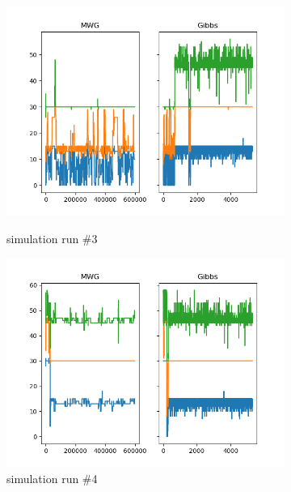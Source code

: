 \begin{figure}[H]
\begin{subfigure}{.3\textwidth}
    	\includegraphics[width=\linewidth]{../../plots/Trace_M4_N60_NMCMC3_seed2_diffind2.png}
    	\label{fig:truth_example}
    	\caption{simulation run \#3}
	\end{subfigure}
	\begin{subfigure}{.3\textwidth}
	    \centering
    	\includegraphics[width=\linewidth]{../../plots/Trace_M4_N60_NMCMC3_seed3_diffind2.png}
    	\caption{simulation run \#4}
	\end{subfigure}
	\begin{subfigure}{.3\textwidth}
	    \centering

\end{subfigure}
\end{figure}
